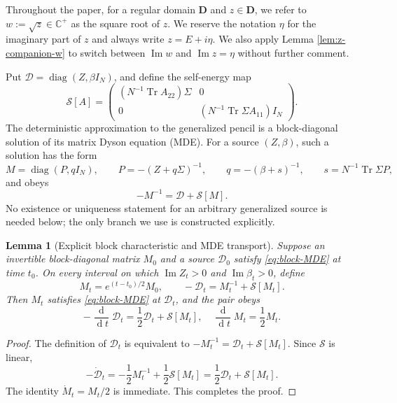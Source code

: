 \documentclass[11pt,reqno]{amsart}
\def\C{\mathbb{C}}
\def\cD{\mathcal{D}}
\def\cS{\mathcal{S}}
\def\bD{\mathbf{D}}
\def\de{\operatorname{d}}
\def\Im{\operatorname{Im}}
\def\Tr{\operatorname{Tr}}
\def\diag{\operatorname{diag}}
\newtheorem{lemma}[theorem]{Lemma}
\theoremstyle{definition}
\numberwithin{equation}{section}
\numberwithin{figure}{section}
\begin{document}
Throughout the paper, for a regular domain $\bD$ and $z\in\bD$, we refer to $w:=\sqrt{z}\in\C^+$ as the square root of $z$. We reserve the notation $\eta$ for the imaginary part of $z$ and always write $z=E+i\eta$. We also apply Lemma \ref{lem:z-companion-w} to switch between $\Im w$ and $\Im z=\eta$ without further comment.


Put $\cD=\diag(Z,\beta I_N)$, and define the self-energy map
\begin{equation}\label{eq:block-self-energy}
 \cS[A]
 =
 \begin{pmatrix}
  (N^{-1}\Tr A_{22})\Sigma&0\\
  0&(N^{-1}\Tr\Sigma A_{11})I_N
 \end{pmatrix}.
\end{equation}
The deterministic approximation to the generalized pencil is a block-diagonal solution of its matrix Dyson equation (MDE).  For a source $(Z,\beta)$, such a solution has the form
\[
 M=\diag(P,qI_N),\qquad P=-(Z+q\Sigma)^{-1},\qquad q=-(\beta+s)^{-1},\qquad s=N^{-1}\Tr\Sigma P,
\]
and obeys
\begin{equation}\label{eq:block-MDE}
 -M^{-1}=\cD+\cS[M].
\end{equation}
No existence or uniqueness statement for an arbitrary generalized source is needed below; the only branch we use is constructed explicitly.

\begin{lemma}[Explicit block characteristic and MDE transport]
\label{lem:block-M-transport}
Suppose an invertible block-diagonal matrix $M_0$ and a source $\cD_0$ satisfy \eqref{eq:block-MDE} at time $t_0$. On every interval on which $\Im Z_t>0$ and $\Im\beta_t>0$, define
\begin{equation}\label{eq:explicit-block-characteristic}
 M_t=e^{(t-t_0)/2}M_0,\qquad -\cD_t=M_t^{-1}+\cS[M_t].
\end{equation}
Then $M_t$ satisfies \eqref{eq:block-MDE} at $\cD_t$, and the pair obeys
\[
    -\frac{\de }{\de t}\cD_t=\frac{1}{2}\cD_t+\cS[M_t],\quad \frac{\de}{\de t}M_t=\frac{1}{2}M_t.
\]
\end{lemma}

\begin{proof}
The definition of $\cD_t$ is equivalent to $-M_t^{-1}=\cD_t+\cS[M_t]$.  Since $\cS$ is linear,
\[
 -\dot{\cD}_t
 =-\frac12M_t^{-1}+\frac12\cS[M_t]
 =\frac12\cD_t+\cS[M_t].
\]
The identity $\dot M_t=M_t/2$ is immediate. This completes the proof.
\end{proof}
\end{document}
